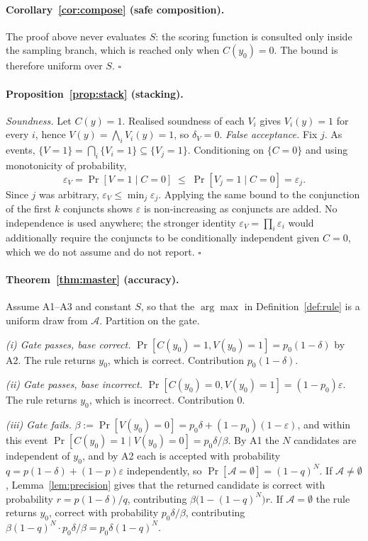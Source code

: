 \documentclass[11pt]{article}
\begin{document}
\paragraph{Corollary~\ref{cor:compose} (safe composition).}
The proof above never evaluates $S$: the scoring function is consulted only inside the sampling branch, which is reached only when $C(y_0)=0$. The bound is therefore uniform over $S$. \hfill$\square$

\paragraph{Proposition~\ref{prop:stack} (stacking).}
\emph{Soundness.} Let $C(y)=1$. Realised soundness of each $V_i$ gives $V_i(y)=1$ for every $i$, hence $V(y)=\bigwedge_iV_i(y)=1$, so $\delta_V=0$.
\emph{False acceptance.} Fix $j$. As events, $\{V=1\}=\bigcap_i\{V_i=1\}\subseteq\{V_j=1\}$. Conditioning on $\{C=0\}$ and using monotonicity of probability,
\[\varepsilon_V=\Pr[V{=}1\mid C{=}0]\;\le\;\Pr[V_j{=}1\mid C{=}0]=\varepsilon_j.\]
Since $j$ was arbitrary, $\varepsilon_V\le\min_j\varepsilon_j$. Applying the same bound to the conjunction of the first $k$ conjuncts shows $\varepsilon$ is non-increasing as conjuncts are added. No independence is used anywhere; the stronger identity $\varepsilon_V=\prod_i\varepsilon_i$ would additionally require the conjuncts to be conditionally independent given $C=0$, which we do not assume and do not report. \hfill$\square$

\paragraph{Theorem~\ref{thm:master} (accuracy).}
Assume A1--A3 and constant $S$, so that the $\arg\max$ in Definition~\ref{def:rule} is a uniform draw from $\mathcal{A}$. Partition on the gate.

\emph{(i) Gate passes, base correct.} $\Pr[C(y_0){=}1,V(y_0){=}1]=p_0(1-\delta)$ by A2. The rule returns $y_0$, which is correct. Contribution $p_0(1-\delta)$.

\emph{(ii) Gate passes, base incorrect.} $\Pr[C(y_0){=}0,V(y_0){=}1]=(1-p_0)\varepsilon$. The rule returns $y_0$, which is incorrect. Contribution $0$.

\emph{(iii) Gate fails.} $\beta:=\Pr[V(y_0){=}0]=p_0\delta+(1-p_0)(1-\varepsilon)$, and within this event $\Pr[C(y_0){=}1\mid V(y_0){=}0]=p_0\delta/\beta$. By A1 the $N$ candidates are independent of $y_0$, and by A2 each is accepted with probability $q=p(1-\delta)+(1-p)\varepsilon$ independently, so $\Pr[\mathcal{A}=\emptyset]=(1-q)^N$.
If $\mathcal{A}\neq\emptyset$, Lemma~\ref{lem:precision} gives that the returned candidate is correct with probability $r=p(1-\delta)/q$, contributing $\beta\bigl(1-(1-q)^N\bigr)r$.
If $\mathcal{A}=\emptyset$ the rule returns $y_0$, correct with probability $p_0\delta/\beta$, contributing $\beta(1-q)^N\cdot p_0\delta/\beta=p_0\delta(1-q)^N$.
\end{document}
